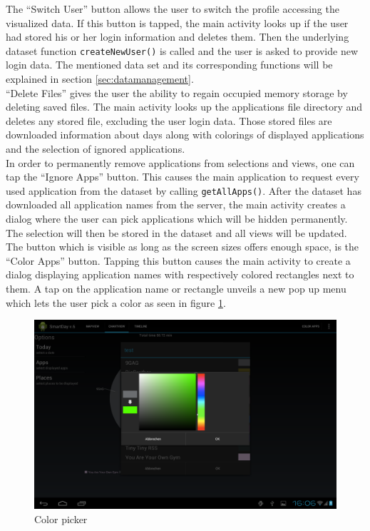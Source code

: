 The  ``Switch User'' button allows the user to switch the profile accessing the visualized data. If this button is tapped, the main activity looks up if the user had stored his or her login information and deletes them. Then the underlying dataset function \lstinline$createNewUser()$ is called and the user is asked to provide new login data. The mentioned data set and its corresponding functions will be explained in section \ref{sec:datamanagement}.\\
``Delete Files''  gives the user the ability to regain occupied memory storage by deleting saved files. The main activity looks up the applications file directory and deletes any stored file, excluding the user login data. Those stored files are downloaded information about days along with colorings of displayed applications and the selection of ignored applications.\\
In  order to permanently remove applications from selections and views, one can tap the ``Ignore Apps'' button. This causes the main application to request every used application from the dataset by calling \lstinline$getAllApps()$. After the dataset has downloaded all application names from the server, the main activity creates a dialog where the user can pick applications which will be hidden permanently. The selection will then be stored in the dataset and all views will be updated.\\
The  button which is visible as long as the screen sizes offers enough space, is the ``Color Apps'' button. Tapping this button causes the main activity to create a dialog displaying application names with respectively colored rectangles next to them. A tap on the application name or rectangle unveils a new pop up menu which lets the user pick a color as seen in figure \ref{img:colorpicker}.
\begin{figure}[h]
	\caption{Color picker}
	\label{img:colorpicker}
	\includegraphics[width=\textwidth]{images/Screenshots/v6/Screenshot_2013-08-19-16-06-13.png}
\end{figure}


